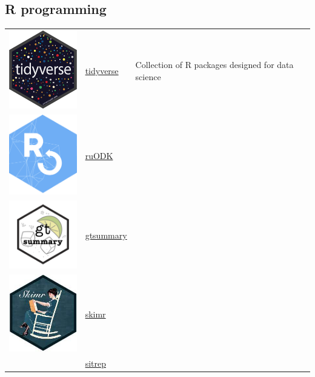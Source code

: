\documentclass[
  letterpaper,
  DIV=11,
  numbers=noendperiod,
  oneside]{scrreprt}
\begin{document}
\hypertarget{r-programming-1}{%
\subsection{R programming}\label{r-programming-1}}

\begin{longtable}[]{@{}
  >{\raggedright\arraybackslash}p{}
  >{\raggedright\arraybackslash}p{}
  >{\raggedright\arraybackslash}p{}@{}}
\toprule()
\endhead
\includegraphics[width=1.30208in,height=\textheight]{./images/tidyverse-logo.png}
& \href{https://www.tidyverse.org/}{tidyverse} & Collection of R
packages designed for data science \\
\includegraphics[width=1.30208in,height=\textheight]{./images/logo.png}
& \href{https://docs.ropensci.org/ruODK/index.html}{ruODK} & \\
\includegraphics[width=1.30208in,height=\textheight]{./images/logo-01.png}
& \href{https://www.danieldsjoberg.com/gtsummary/}{gtsummary} & \\
\includegraphics[width=1.30208in,height=\textheight]{./images/paste-A6E65357.png}
&
\href{https://cran.r-project.org/web/packages/skimr/vignettes/skimr.html}{skimr}
& \\
& \href{https://github.com/R4EPI/sitrep}{sitrep} & \\
\bottomrule()
\end{longtable}
\end{document}
